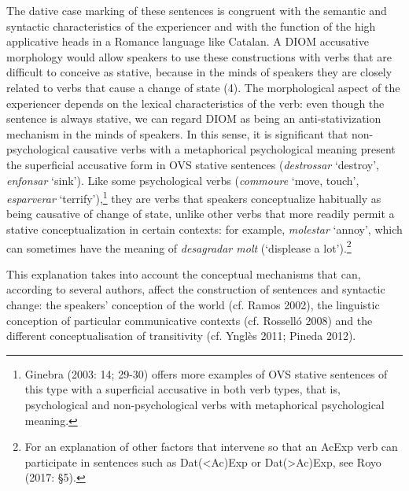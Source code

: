 \documentclass[12pt]{article}
\newenvironment{styleStandard}{\setlength\leftskip{0cm}\setlength\rightskip{0cm plus 1fil}\setlength\parindent{0cm}\setlength\parfillskip{0pt plus 1fil}\setlength\parskip{0in plus 1pt}\writerlistparindent\writerlistleftskip\leavevmode\normalfont\normalsize\writerlistlabel\ignorespaces}{\unskip\vspace{0.111in plus 0.0111in}\par}
\newcommand\writerlistleftskip{}
\newcommand\writerlistparindent{}
\newcommand\writerlistlabel{}
\begin{document}
\begin{styleStandard}
The dative case marking of these sentences is congruent with the semantic and syntactic characteristics of the experiencer and with the function of the high applicative heads in a Romance language like Catalan. A DIOM accusative morphology would allow speakers to use these constructions with verbs that are difficult to conceive as stative, because in the minds of speakers they are closely related to verbs that cause a change of state (4). The morphological aspect of the experiencer depends on the lexical characteristics of the verb: even though the sentence is always stative, we can regard DIOM as being an anti-stativization mechanism in the minds of speakers. In this sense, it is significant that non-psychological causative verbs with a metaphorical psychological meaning present the superficial accusative form in OVS stative sentences (\textit{destrossar} ‘destroy’, \textit{enfonsar} ‘sink’). Like some psychological verbs (\textit{commoure} ‘move, touch’, \textit{esparverar} ‘terrify’),\footnote{ Ginebra (2003: 14; 29-30) offers more examples of OVS stative sentences of this type with a superficial accusative in both verb types, that is, psychological and non-psychological verbs with metaphorical psychological meaning.} they are verbs that speakers conceptualize habitually as being causative of change of state, unlike other verbs that more readily permit a stative conceptualization in certain contexts: for example, \textit{molestar} ‘annoy’, which can sometimes have the meaning of \textit{desagradar molt} (‘displease a lot').\footnote{ For an explanation of other factors that intervene so that an AcExp verb can participate in sentences such as Dat({\textless}Ac)Exp or Dat({\textgreater}Ac)Exp, see Royo (2017: §5).}
\end{styleStandard}

\begin{styleStandard}
This explanation takes into account the conceptual mechanisms that can, according to several authors, affect the construction of sentences and syntactic change: the speakers’ conception of the world (cf. Ramos 2002), the linguistic conception of particular communicative contexts (cf. Rosselló 2008) and the different conceptualisation of transitivity (cf. Ynglès 2011; Pineda 2012).
\end{styleStandard}
\end{document}
